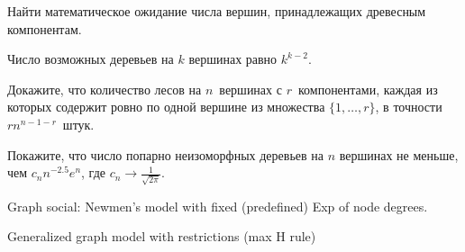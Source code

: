 \begin{problem}
Найти математическое ожидание числа вершин, принадлежащих древесным компонентам.
\begin{ordre}
Число возможных деревьев на $k$ вершинах равно $k^{k-2}$. 
\end{ordre}
\end{problem}

\begin{problem}
Докажите, что количество лесов на $n$~вершинах с $r$~компонентами, каждая из которых содержит ровно по одной вершине из множества $ \{1, \ldots, r\} $, в точности $rn^{n-1-r}$~штук.
\end{problem}

\begin{problem}
Покажите, что число попарно неизоморфных деревьев на $n$ вершинах не меньше, чем $ c_n n^{-2.5} e^n $, где $ c_n \to \frac{1}{\sqrt{2\pi}}$.
\end{problem}

\begin{problem}
Graph social: Newmen's model with fixed (predefined) Exp of node degrees.
\end{problem}

\begin{problem}
Generalized graph model with restrictions (max H rule) 
\end{problem}